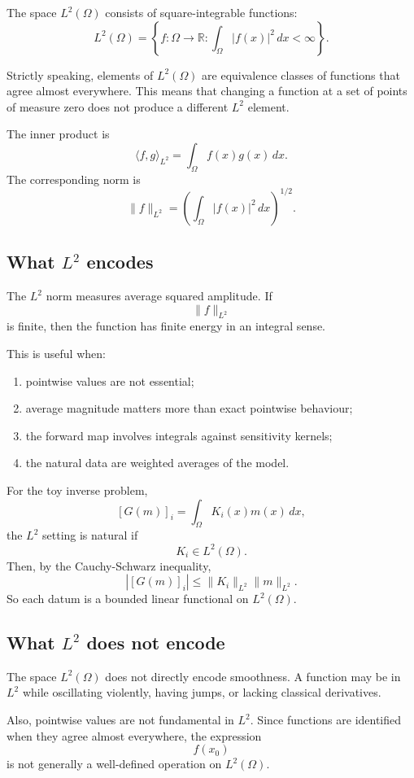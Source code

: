 \documentclass[11pt,a4paper]{book}
\newcommand{\R}{\mathbb{R}}
\newcommand{\G}{G}
\begin{document}
The space $L^2(\Omega)$ consists of square-integrable functions:
\[
    L^2(\Omega)
    =
    \left\{
        f : \Omega \to \R
        :
        \int_\Omega |f(x)|^2\,dx < \infty
    \right\}.
\]

Strictly speaking, elements of $L^2(\Omega)$ are equivalence classes of
functions that agree almost everywhere. This means that changing a function at
a set of points of measure zero does not produce a different $L^2$ element.

The inner product is
\[
    \langle f,g\rangle_{L^2}
    =
    \int_\Omega f(x)g(x)\,dx.
\]
The corresponding norm is
\[
    \|f\|_{L^2}
    =
    \left(
        \int_\Omega |f(x)|^2\,dx
    \right)^{1/2}.
\]

\subsection{What $L^2$ encodes}

The $L^2$ norm measures average squared amplitude. If
\[
    \|f\|_{L^2}
\]
is finite, then the function has finite energy in an integral sense.

This is useful when:
\begin{enumerate}[label=\arabic*.]
    \item pointwise values are not essential;
    \item average magnitude matters more than exact pointwise behaviour;
    \item the forward map involves integrals against sensitivity kernels;
    \item the natural data are weighted averages of the model.
\end{enumerate}

For the toy inverse problem,
\[
    [\G(m)]_i
    =
    \int_\Omega K_i(x)m(x)\,dx,
\]
the $L^2$ setting is natural if
\[
    K_i\in L^2(\Omega).
\]
Then, by the Cauchy-Schwarz inequality,
\[
    |[\G(m)]_i|
    \leq
    \|K_i\|_{L^2}
    \|m\|_{L^2}.
\]
So each datum is a bounded linear functional on $L^2(\Omega)$.

\subsection{What $L^2$ does not encode}

The space $L^2(\Omega)$ does not directly encode smoothness. A function may be
in $L^2$ while oscillating violently, having jumps, or lacking classical
derivatives.

Also, pointwise values are not fundamental in $L^2$. Since functions are
identified when they agree almost everywhere, the expression
\[
    f(x_0)
\]
is not generally a well-defined operation on $L^2(\Omega)$.
\end{document}
